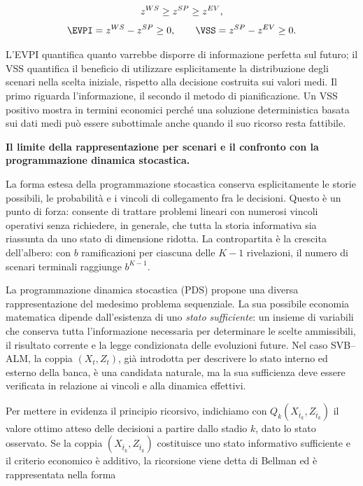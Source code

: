 \[
\begin{gathered}
z^{WS}\geq z^{SP}\geq z^{EV},\\[3pt]
\EVPI=z^{WS}-z^{SP}\geq0,
\qquad
\VSS=z^{SP}-z^{EV}\geq0.
\end{gathered}
\]

L'EVPI quantifica quanto varrebbe disporre di informazione
perfetta sul futuro; il VSS quantifica il beneficio di
utilizzare esplicitamente la distribuzione degli scenari nella
scelta iniziale, rispetto alla decisione costruita sui valori
medi. Il primo riguarda l'informazione, il secondo il metodo di
pianificazione. Un VSS positivo mostra in termini economici
perch\'{e} una soluzione deterministica basata sui dati medi pu\`o
essere subottimale anche quando il suo ricorso resta fattibile.

\medskip
\noindent
\textbf{Il limite della rappresentazione per scenari e il
confronto con la programmazione dinamica stocastica.}

La forma estesa della programmazione stocastica conserva
esplicitamente le storie possibili, le probabilit\`a e i vincoli
di collegamento fra le decisioni. Questo \`e un punto di forza:
consente di trattare problemi lineari con numerosi vincoli
operativi senza richiedere, in generale, che tutta la storia
informativa sia riassunta da uno stato di dimensione ridotta.
La contropartita \`e la crescita dell'albero: con
$b$ ramificazioni per ciascuna delle $K-1$ rivelazioni, il
numero di scenari terminali raggiunge $b^{K-1}$.

La programmazione dinamica stocastica (PDS) propone una diversa
rappresentazione del medesimo problema sequenziale. La sua
possibile economia matematica dipende dall'esistenza di uno
\emph{stato sufficiente}: un insieme di variabili che conserva
tutta l'informazione necessaria per determinare le scelte
ammissibili, il risultato corrente e la legge condizionata delle
evoluzioni future. Nel caso SVB--ALM, la coppia $(X_t,Z_t)$, gi\`a
introdotta per descrivere lo stato interno ed esterno della banca,
\`e una candidata naturale, ma la sua sufficienza deve essere
verificata in relazione ai vincoli e alla dinamica effettivi.

Per mettere in evidenza il principio ricorsivo,
indichiamo con $Q_k(X_{\bar t_k},Z_{\bar t_k})$
il valore ottimo atteso delle decisioni
a partire dallo stadio $k$, dato lo stato
osservato. Se la coppia $(X_{\bar t_k},Z_{\bar t_k})$
costituisce uno stato informativo sufficiente e
il criterio economico \`e additivo,
la ricorsione viene detta di Bellman ed \`e 
rappresentata nella forma


